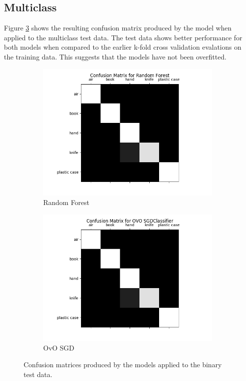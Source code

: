 \documentclass[12pt]{article}
\begin{document}
\subsection{Multiclass}

Figure \ref{fig:testmulticlass} shows the resulting confusion matrix produced by the model when applied to the multiclass test data. The test data shows better performance for both models when compared to the earlier k-fold cross validation evalations on the training data. This suggests that the models have not been overfitted. 

\begin{figure}[!ht]
\centering
\begin{subfigure}{.5\textwidth}
  \centering
  \includegraphics[width=\linewidth]{images/mctestrf}
	\caption{Random Forest}
  \label{fig:mcrf}
\end{subfigure}%
\begin{subfigure}{.5\textwidth}
  \centering
  \includegraphics[width=\linewidth]{images/mctestsgd}
  \caption{OvO SGD}
  \label{fig:mcsgd}
\end{subfigure}
\caption{Confusion matrices produced by the models applied to the binary test data.}
\label{fig:testmulticlass}
\end{figure}
\end{document}
